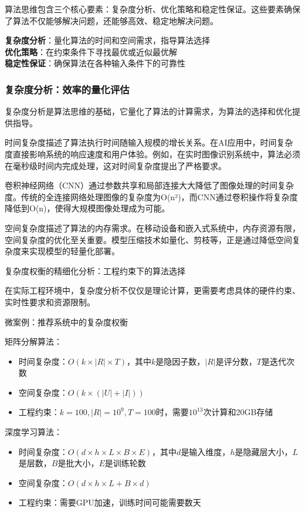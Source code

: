 算法思维包含三个核心要素：复杂度分析、优化策略和稳定性保证。这些要素确保了算法不仅能够解决问题，还能够高效、稳定地解决问题。

\begin{tcolorbox}[colback=orange!5!white,colframe=orange!75!black,title=核心要素：算法思维的三大支柱]
\textbf{复杂度分析}：量化算法的时间和空间需求，指导算法选择\\
\textbf{优化策略}：在约束条件下寻找最优或近似最优解\\
\textbf{稳定性保证}：确保算法在各种输入条件下的可靠性
\end{tcolorbox}

\subsubsection{复杂度分析：效率的量化评估}

复杂度分析是算法思维的基础，它量化了算法的计算需求，为算法的选择和优化提供指导。

时间复杂度描述了算法执行时间随输入规模的增长关系。在AI应用中，时间复杂度直接影响系统的响应速度和用户体验。例如，在实时图像识别系统中，算法必须在毫秒级时间内完成处理，这对时间复杂度提出了严格要求。

卷积神经网络（CNN）通过参数共享和局部连接大大降低了图像处理的时间复杂度。传统的全连接网络处理图像的复杂度为O(n²)，而CNN通过卷积操作将复杂度降低到O(n)，使得大规模图像处理成为可能。

空间复杂度描述了算法的内存需求。在移动设备和嵌入式系统中，内存资源有限，空间复杂度的优化至关重要。模型压缩技术如量化、剪枝等，正是通过降低空间复杂度来实现模型的轻量化部署。

复杂度权衡的精细化分析：工程约束下的算法选择

在实际工程环境中，复杂度分析不仅仅是理论计算，更需要考虑具体的硬件约束、实时性要求和资源限制。

微案例：推荐系统中的复杂度权衡

矩阵分解算法：
\begin{itemize}
\item 时间复杂度：$O(k \times |R| \times T)$，其中$k$是隐因子数，$|R|$是评分数，$T$是迭代次数
\item 空间复杂度：$O(k \times (|U| + |I|))$
\item 工程约束：$k=100, |R|=10^9, T=100$时，需要$10^{13}$次计算和20GB存储
\end{itemize}

深度学习算法：
\begin{itemize}
\item 时间复杂度：$O(d \times h \times L \times B \times E)$，其中$d$是输入维度，$h$是隐藏层大小，$L$是层数，$B$是批大小，$E$是训练轮数
\item 空间复杂度：$O(d \times h \times L + B \times d)$
\item 工程约束：需要GPU加速，训练时间可能需要数天
\end{itemize}

